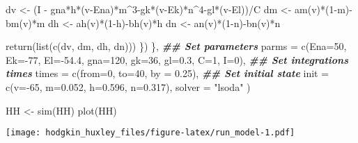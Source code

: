 \documentclass[
]{article}
\newenvironment{Shaded}{\begin{snugshade}}{\end{snugshade}}
\newcommand{\AttributeTok}[1]{\textcolor[rgb]{0.77,0.63,0.00}{#1}}
\newcommand{\DecValTok}[1]{\textcolor[rgb]{0.00,0.00,0.81}{#1}}
\newcommand{\DocumentationTok}[1]{\textcolor[rgb]{0.56,0.35,0.01}{\textbf{\textit{#1}}}}
\newcommand{\FloatTok}[1]{\textcolor[rgb]{0.00,0.00,0.81}{#1}}
\newcommand{\FunctionTok}[1]{\textcolor[rgb]{0.00,0.00,0.00}{#1}}
\newcommand{\NormalTok}[1]{#1}
\newcommand{\OtherTok}[1]{\textcolor[rgb]{0.56,0.35,0.01}{#1}}
\newcommand{\SpecialCharTok}[1]{\textcolor[rgb]{0.00,0.00,0.00}{#1}}
\newcommand{\StringTok}[1]{\textcolor[rgb]{0.31,0.60,0.02}{#1}}
\begin{document}
\begin{Shaded}
\begin{Highlighting}[]
\NormalTok{    dv }\OtherTok{\textless{}{-}}\NormalTok{ (I }\SpecialCharTok{{-}}\NormalTok{ gna}\SpecialCharTok{*}\NormalTok{h}\SpecialCharTok{*}\NormalTok{(v}\SpecialCharTok{{-}}\NormalTok{Ena)}\SpecialCharTok{*}\NormalTok{m}\SpecialCharTok{\^{}}\DecValTok{3}\SpecialCharTok{{-}}\NormalTok{gk}\SpecialCharTok{*}\NormalTok{(v}\SpecialCharTok{{-}}\NormalTok{Ek)}\SpecialCharTok{*}\NormalTok{n}\SpecialCharTok{\^{}}\DecValTok{4}\SpecialCharTok{{-}}\NormalTok{gl}\SpecialCharTok{*}\NormalTok{(v}\SpecialCharTok{{-}}\NormalTok{El))}\SpecialCharTok{/}\NormalTok{C}
\NormalTok{    dm }\OtherTok{\textless{}{-}} \FunctionTok{am}\NormalTok{(v)}\SpecialCharTok{*}\NormalTok{(}\DecValTok{1}\SpecialCharTok{{-}}\NormalTok{m)}\SpecialCharTok{{-}}\FunctionTok{bm}\NormalTok{(v)}\SpecialCharTok{*}\NormalTok{m}
\NormalTok{    dh }\OtherTok{\textless{}{-}} \FunctionTok{ah}\NormalTok{(v)}\SpecialCharTok{*}\NormalTok{(}\DecValTok{1}\SpecialCharTok{{-}}\NormalTok{h)}\SpecialCharTok{{-}}\FunctionTok{bh}\NormalTok{(v)}\SpecialCharTok{*}\NormalTok{h}
\NormalTok{    dn }\OtherTok{\textless{}{-}} \FunctionTok{an}\NormalTok{(v)}\SpecialCharTok{*}\NormalTok{(}\DecValTok{1}\SpecialCharTok{{-}}\NormalTok{n)}\SpecialCharTok{{-}}\FunctionTok{bn}\NormalTok{(v)}\SpecialCharTok{*}\NormalTok{n}
    
    \FunctionTok{return}\NormalTok{(}\FunctionTok{list}\NormalTok{(}\FunctionTok{c}\NormalTok{(dv, dm, dh, dn)))}
\NormalTok{  \})}
\NormalTok{  \},}
  \DocumentationTok{\#\# Set parameters}
  \AttributeTok{parms =} \FunctionTok{c}\NormalTok{(}\AttributeTok{Ena=}\DecValTok{50}\NormalTok{, }\AttributeTok{Ek=}\SpecialCharTok{{-}}\DecValTok{77}\NormalTok{, }\AttributeTok{El=}\SpecialCharTok{{-}}\FloatTok{54.4}\NormalTok{, }\AttributeTok{gna=}\DecValTok{120}\NormalTok{, }\AttributeTok{gk=}\DecValTok{36}\NormalTok{, }\AttributeTok{gl=}\FloatTok{0.3}\NormalTok{, }\AttributeTok{C=}\DecValTok{1}\NormalTok{, }\AttributeTok{I=}\DecValTok{0}\NormalTok{),}
  \DocumentationTok{\#\# Set integrations times}
  \AttributeTok{times =} \FunctionTok{c}\NormalTok{(}\AttributeTok{from=}\DecValTok{0}\NormalTok{, }\AttributeTok{to=}\DecValTok{40}\NormalTok{, }\AttributeTok{by =} \FloatTok{0.25}\NormalTok{),}
  \DocumentationTok{\#\# Set initial state}
  \AttributeTok{init =} \FunctionTok{c}\NormalTok{(}\AttributeTok{v=}\SpecialCharTok{{-}}\DecValTok{65}\NormalTok{, }\AttributeTok{m=}\FloatTok{0.052}\NormalTok{, }\AttributeTok{h=}\FloatTok{0.596}\NormalTok{, }\AttributeTok{n=}\FloatTok{0.317}\NormalTok{),}
  \AttributeTok{solver =} \StringTok{"lsoda"}
\NormalTok{)}
\end{Highlighting}
\end{Shaded}

\begin{Shaded}
\begin{Highlighting}[]
\NormalTok{HH }\OtherTok{\textless{}{-}} \FunctionTok{sim}\NormalTok{(HH)}
\FunctionTok{plot}\NormalTok{(HH)}
\end{Highlighting}
\end{Shaded}

\texttt{[image: hodgkin\_huxley\_files/figure-latex/run\_model-1.pdf]}
\end{document}
